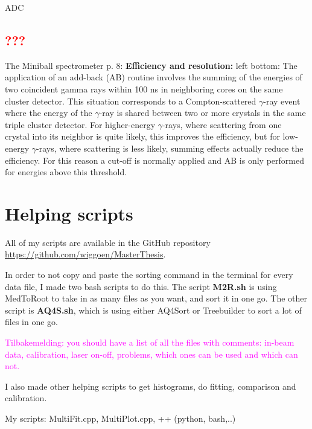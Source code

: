 \documentclass[twoside,english]{uiofysmaster/uiofysmaster}
\newcommand{\ga}{$\gamma$}
\begin{document}
\begin{table}[ht] 
	\centering 
	\caption{ADC}
	
	\label{tab:ADC}
\end{table}


\subsection{\textcolor{red}{???}}
The Miniball spectrometer \cite{MB-spect} \newline
p. 8: \newline
\textbf{Efficiency and resolution:}
left bottom: \newline
The application of an add-back (AB) routine involves the summing of the energies of two coincident gamma rays within 100 ns in neighboring cores on the same cluster detector. This situation corresponds to a Compton-scattered \ga-ray event where the energy of the \ga-ray is shared between two or more crystals in the same triple cluster detector. For higher-energy \ga-rays, where scattering from one crystal into its neighbor is quite likely, this improves the efficiency, but for low-energy \ga-rays, where scattering is less likely, summing effects actually reduce the efficiency. For this reason a cut-off is normally applied and AB is only performed for energies above this threshold. \newline


\section{Helping scripts}
All of my scripts are available in the GitHub repository \url{https://github.com/wiggoen/MasterThesis}.

In order to not copy and paste the sorting command in the terminal for every data file, I made two bash scripts to do this. The script \textbf{M2R.sh} is using MedToRoot to take in as many files as you want, and sort it in one go. The other script is \textbf{AQ4S.sh}, which is using either AQ4Sort or Treebuilder to sort a lot of files in one go. 

\textcolor{Magenta}{Tilbakemelding: \newline 
you should have a list of all the files with comments: in-beam data, calibration, laser on-off, problems, which ones can be used and which can not.
}

I also made other helping scripts to get histograms, do fitting, comparison and calibration. 

My scripts: MultiFit.cpp, MultiPlot.cpp, ++ (python, bash,..)
\end{document}
